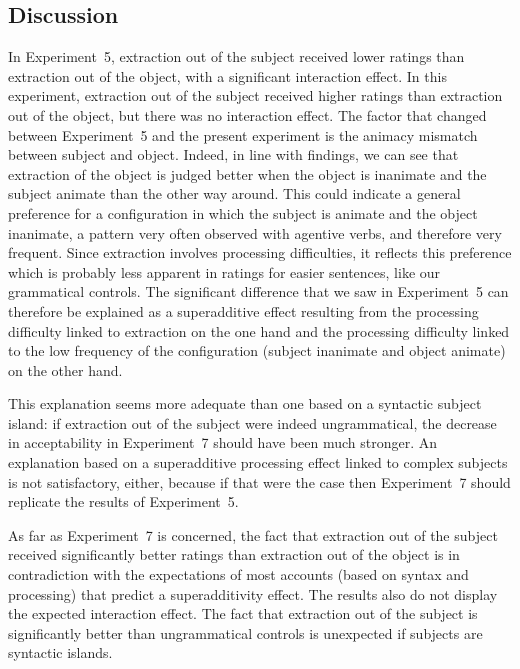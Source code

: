 

\subsection{Discussion}

In Experiment~5, extraction out of the subject received lower ratings than extraction out of the object, with a significant interaction effect. In this experiment, extraction out of the subject received higher ratings than extraction out of the object, but there was no interaction effect. The factor that changed between Experiment~5 and the present experiment is the animacy mismatch between subject and object. Indeed, in line with   findings, we can see that extraction of the object is judged better when the object is inanimate and the subject animate than the other way around. This could indicate a general preference for a configuration in which the subject is animate and the object inanimate, a pattern very often observed with agentive verbs, and therefore very frequent. Since extraction involves processing difficulties, it reflects this preference which is probably less apparent in ratings for easier sentences, like our grammatical controls. The significant difference that we saw in Experiment~5 can therefore be explained as a superadditive effect resulting from the processing difficulty linked to extraction on the one hand and the processing difficulty linked to the low frequency of the configuration (subject inanimate and object animate) on the other hand.

This explanation seems more adequate than one based on a syntactic subject island: if extraction out of the subject were indeed ungrammatical, the decrease in acceptability in Experiment~7 should have been much stronger. An explanation based on a  superadditive processing effect linked to complex subjects is not satisfactory, either, because if that were the case then Experiment~7 should replicate the results of Experiment~5. 

As far as Experiment~7 is concerned, the fact that extraction out of the subject received significantly better ratings than extraction out of the object is in contradiction with the expectations of most accounts (based on syntax and processing) that predict a superadditivity effect. The results also do not display the expected interaction effect. The fact that extraction out of the subject is significantly better than ungrammatical controls is unexpected if subjects are syntactic islands. 

